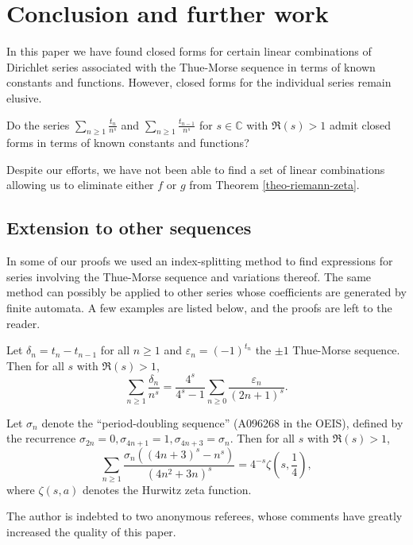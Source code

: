 \documentclass[12pt,reqno]{article}
\begin{document}
\section{Conclusion and further work}

In this paper we have found closed forms for certain linear combinations of Dirichlet series associated with the Thue-Morse sequence in terms of known constants and functions. However, closed forms for the individual series remain elusive.
\begin{question}
	Do the series $\displaystyle \sum_{n\geq1} \frac{t_n}{n^s}$ and $\displaystyle \sum_{n\geq1} \frac{t_{n-1}}{n^s}$ for $s \in \mathbb{C}$ with $\Re(s)>1$ admit closed forms in terms of known constants and functions?
\end{question}
Despite our efforts, we have not been able to find a set of linear combinations allowing us to eliminate either $f$ or $g$ from Theorem \ref{theo-riemann-zeta}.

\subsection{Extension to other sequences}

In some of our proofs we used an index-splitting method to find expressions for series involving the Thue-Morse sequence and variations thereof. The same method can possibly be applied to other series whose coefficients are generated by finite automata. A few examples are listed below, and the proofs are left to the reader.
\begin{example} \label{theo-delta} \rm
	Let $\delta_n = t_n-t_{n-1}$ for all $n\geq1$ and $\varepsilon_n=(-1)^{t_n}$ the $\pm1$ Thue-Morse sequence. Then for all $s$ with $\Re(s)>1$,
	$$
	\sum_{n\geq1} \frac{\delta_n}{n^s} = \frac{4^s}{4^{s}-1} \sum_{n\geq0} \frac{\varepsilon_n}{(2n+1)^s}.
	$$
\end{example}

\begin{example} \rm
	Let $\sigma_n$ denote the ``period-doubling sequence'' (A096268 in the OEIS), defined by the recurrence $\sigma_{2n}=0, \sigma_{4n+1} = 1, \sigma_{4n+3} = \sigma_n$. Then for all $s$ with $\Re(s)>1$,
	$$
	\sum_{n\geq1} \frac{\sigma_n \left( (4n+3)^{s} - n^{s} \right)}{\left( 4n^2+3n \right)^s} = 4^{-s} \zeta\left(s,\frac14\right),
	$$
	where $\zeta(s,a)$ denotes the Hurwitz zeta function.
\end{example}

The author is indebted to two anonymous referees, whose comments have greatly increased the quality of this paper.
\end{document}
